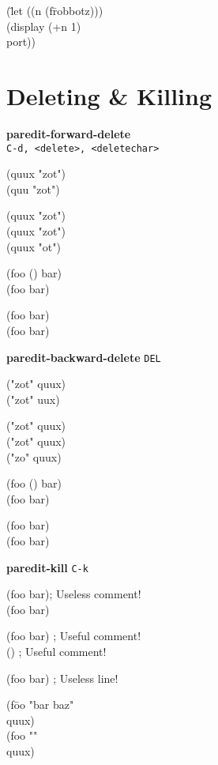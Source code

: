 \documentclass[10pt,landscape,a4paper]{article}
\newenvironment{nstabbing}
  {\setlength{\topsep}{-\parskip}%
   \setlength{\partopsep}{0.2em}%
   \tabbing}
  {\endtabbing}
\begin{document}
\begin{multicols}{4}
{\begin{nstabbing}
(\=let ((n (f\=robbotz)))\\
\>\cursor (display (+n 1)\\
\>\>
port))
\end{nstabbing}
}

    \section*{\large{Deleting \& Killing}}

\textbf{paredit-forward-delete} \\\texttt{C-d, <delete>, <deletechar>}

{\ttfamily
(quu\cursor{}x "zot")\\
(quu\cursor{} "zot")

(quux \cursor"zot")\\
(quux "\cursor zot")\\
(quux "\cursor ot")

(foo (\cursor) bar)\\
(foo \cursor{} bar)

\cursor(foo bar)\\
(\cursor foo bar)
}

\textbf{paredit-backward-delete} \texttt{DEL}

{\ttfamily
("zot" q\cursor uux)\\
("zot" \cursor uux)

("zot"\cursor{} quux)\\
("zot\cursor" quux)\\
("zo\cursor" quux)

(foo (\cursor) bar)\\
(foo \cursor{} bar)

(foo bar)\cursor\\
(foo bar\cursor)
}

\textbf{paredit-kill} \texttt{C-k}

{\ttfamily
(foo bar)\cursor \space \space \space ; Useless comment!\\
(foo bar)\cursor

(\cursor foo bar) \space \space \space ; Useful comment!\\
(\cursor) \space \space \space ; Useful comment!

\cursor(foo bar) \space \space \space ; Useless line!\\
\cursor

\begin{nstabbing}
(f\=oo "\cursor bar baz"\\
\>quux)\\
(foo "\cursor"\\
\>quux)
\end{nstabbing}
}


\end{multicols}
\end{document}
